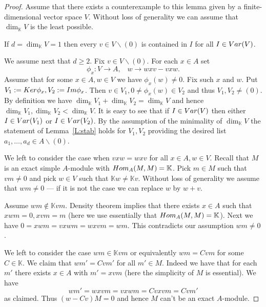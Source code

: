 \documentclass[10pt,a4paper]{amsart}
\begin{document}
\begin{proof} 
Assume that there exists a counterexample to this lemma given by a finite-dimensional vector space $V$. 
Without loss of generality we can assume that $\dim_{\mathbb K} V$ is the least possible. 

If $d=\dim_{\mathbb K} V=1$ then every $v\in V\backslash(0)$ is contained in $I$ for all $I\in{\rm Var}(V)$.

We assume next that $d\ge2$. 
Fix $v\in V\backslash(0)$. 
For each $x\in A$ set
$$\phi_x: V\to A, \hspace{10pt} w\to wxv-vxw.$$
Assume that for some $x\in A, w\in V$ we have $\phi_x(w)\ne0$. 
Fix such $x$ and $w$. 
Put $V_1:={\rm Ker}\phi_x, V_2:={\rm Im}\phi_x$. 
Then $v\in V_1, 0\ne\phi_x(w)\in V_2$ and thus $V_1, V_2\ne (0)$. 
By definition we have $\dim_{\mathbb K} V_1+\dim_{\mathbb K} V_2=\dim_{\mathbb K} V$ and hence $\dim_{\mathbb K} V_1, \dim_{\mathbb K} V_2<\dim_{\mathbb K} V$. 
It is easy to see that if $I\in{\rm Var}(V)$ then either $I\in{\rm Var}(V_1)$ or $I\in{\rm Var}(V_2)$. 
By the assumption of the minimality of $\dim_{\mathbb K}V$ the statement of Lemma~\ref{L:stab} holds for $V_1, V_2$ providing the desired list $a_1,\ldots, a_d\in A\backslash(0)$.

We left to consider the case when $vxw=wxv$ for all $x\in A, w\in V$. 
Recall that $M$ is an exact simple $A$-module with ${\rm Hom}_{A}(M, M)=\mathbb K$. 
Pick $m\in M$ such that $vm\ne 0$ and pick $w\in V$ such that  $\mathbb Kw\ne\mathbb Kv$. 
Without loss of generality we assume that $wm\ne0$ --- if it is not the case we can replace $w$ by $w+v$. 

Assume $wm\notin\mathbb Kvm$. 
Density theorem implies that there exists $x\in A$ such that $xwm=0, xvm=m$ (here we use essentially that ${\rm Hom}_A(M, M)=\mathbb K$). 
Next we have $0=xwm=vxwm=wxvm=wm$. 
This contradicts our assumption $wm\ne0$. 

We left to consider the case $wm\in\mathbb Kvm$ or equivalently $wm=Cvm$ for some $C\in\mathbb K$. 
We claim that $wm'=Cvm'$ for all $m'\in M$. 
Indeed we have that for each $m'$ there exists $x\in A$ with $m'=xvm$ (here the simplicity of $M$ is essential). 
We have
$$wm'=wxvm=vxwm=Cvxvm=Cvm'$$
as claimed. 
Thus $(w-Cv)M=0$ and hence $M$ can't be an exact $A$-module.
\end{proof}
\end{document}

